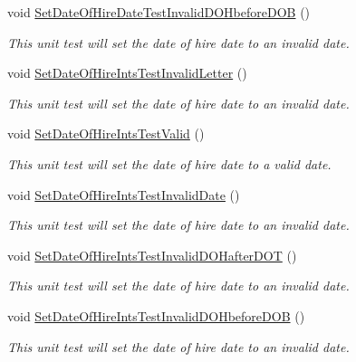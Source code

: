 \begin{DoxyCompactItemize}
void \hyperlink{class_my_all_employee_1_1_tests_1_1_parttime_employee_tests_add3e9cea0f3d03ba1b177590c697e0e1}{Set\+Date\+Of\+Hire\+Date\+Test\+Invalid\+D\+O\+Hbefore\+D\+O\+B} ()
\begin{DoxyCompactList}\small\item\em This unit test will set the date of hire date to an invalid date. \end{DoxyCompactList}\item 
void \hyperlink{class_my_all_employee_1_1_tests_1_1_parttime_employee_tests_a2662fee5c4dbd1e1d6d8038e42d1d615}{Set\+Date\+Of\+Hire\+Ints\+Test\+Invalid\+Letter} ()
\begin{DoxyCompactList}\small\item\em This unit test will set the date of hire date to an invalid date. \end{DoxyCompactList}\item 
void \hyperlink{class_my_all_employee_1_1_tests_1_1_parttime_employee_tests_a660a87661d1dea83cdbcdda435f9704c}{Set\+Date\+Of\+Hire\+Ints\+Test\+Valid} ()
\begin{DoxyCompactList}\small\item\em This unit test will set the date of hire date to a valid date. \end{DoxyCompactList}\item 
void \hyperlink{class_my_all_employee_1_1_tests_1_1_parttime_employee_tests_af43b5633da2c4a81340fdf02dafba5c0}{Set\+Date\+Of\+Hire\+Ints\+Test\+Invalid\+Date} ()
\begin{DoxyCompactList}\small\item\em This unit test will set the date of hire date to an invalid date. \end{DoxyCompactList}\item 
void \hyperlink{class_my_all_employee_1_1_tests_1_1_parttime_employee_tests_aaf42195f47a983540917b2e4a8ef2106}{Set\+Date\+Of\+Hire\+Ints\+Test\+Invalid\+D\+O\+Hafter\+D\+O\+T} ()
\begin{DoxyCompactList}\small\item\em This unit test will set the date of hire date to an invalid date. \end{DoxyCompactList}\item 
void \hyperlink{class_my_all_employee_1_1_tests_1_1_parttime_employee_tests_ac8c15a69d2b818c831a58bee0ad03015}{Set\+Date\+Of\+Hire\+Ints\+Test\+Invalid\+D\+O\+Hbefore\+D\+O\+B} ()
\begin{DoxyCompactList}\small\item\em This unit test will set the date of hire date to an invalid date. \end{DoxyCompactList}\item 

\end{DoxyCompactItemize}

